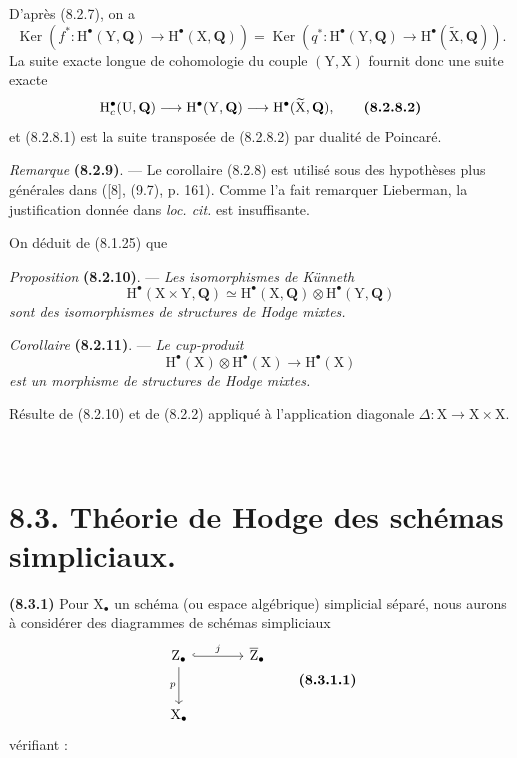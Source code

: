 \documentclass[11pt,leqno]{article}
\newcommand{\Page}[1]{\ifvmode\noindent\else\unskip\ \fi{\footnotesize\textcolor{gray}{[p.\,#1]}}\ \ignorespaces}
\begin{document}
D’après (8.2.7), on a
\[
\operatorname{Ker}(f^*:\mathrm{H}^\bullet(\mathrm{Y},\mathbf{Q})
 \to\mathrm{H}^\bullet(\mathrm{X},\mathbf{Q}))
=
\operatorname{Ker}(q^*:\mathrm{H}^\bullet(\mathrm{Y},\mathbf{Q})
 \to\mathrm{H}^\bullet(\widetilde{\mathrm{X}},\mathbf{Q})).
\]
La suite exacte longue de cohomologie du couple \((\mathrm{Y},\mathrm{X})\) fournit donc une suite exacte
\[
\mathrm{H}_c^\bullet(\mathrm{U},\mathbf{Q})
\longrightarrow\mathrm{H}^\bullet(\mathrm{Y},\mathbf{Q})
\longrightarrow\mathrm{H}^\bullet(\widetilde{\mathrm{X}},\mathbf{Q}),
\tag*{\textbf{(8.2.8.2)}}
\]
et (8.2.8.1) est la suite transposée de (8.2.8.2) par dualité de Poincaré.

\textit{Remarque} \textbf{(8.2.9)}. — Le corollaire (8.2.8) est utilisé sous des hypothèses plus générales dans ([8], (9.7), p. 161). Comme l’a fait remarquer Lieberman, la justification donnée dans \textit{loc. cit.} est insuffisante.

On déduit de (8.1.25) que

\textit{Proposition} \textbf{(8.2.10)}. — \textit{Les isomorphismes de Künneth}
\[
\mathrm{H}^\bullet(\mathrm{X}\times\mathrm{Y},\mathbf{Q})
\simeq
\mathrm{H}^\bullet(\mathrm{X},\mathbf{Q})
\otimes\mathrm{H}^\bullet(\mathrm{Y},\mathbf{Q})
\]
\textit{sont des isomorphismes de structures de Hodge mixtes.}

\textit{Corollaire} \textbf{(8.2.11)}. — \textit{Le cup-produit}
\[
\mathrm{H}^\bullet(\mathrm{X})\otimes\mathrm{H}^\bullet(\mathrm{X})
\longrightarrow\mathrm{H}^\bullet(\mathrm{X})
\]
\textit{est un morphisme de structures de Hodge mixtes.}

Résulte de (8.2.10) et de (8.2.2) appliqué à l’application diagonale \(\Delta:\mathrm{X}\to\mathrm{X}\times\mathrm{X}\).

\Page{41}
\section*{8.3. Théorie de Hodge des schémas simpliciaux.}

\textbf{(8.3.1)} Pour \(\mathrm{X}_\bullet\) un schéma (ou espace algébrique) simplicial séparé, nous aurons à considérer des diagrammes de schémas simpliciaux
\[
\begin{tikzcd}[column sep=large,row sep=large]
\mathrm{Z}_\bullet \arrow[r,hook,"j"] \arrow[d,"p"']
 & \overline{\mathrm{Z}}_\bullet\\
\mathrm{X}_\bullet &
\end{tikzcd}
\tag*{\textbf{(8.3.1.1)}}
\]
vérifiant :
\end{document}
